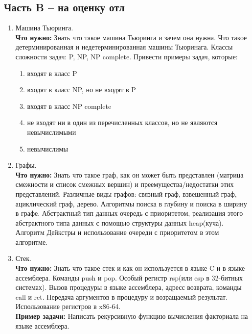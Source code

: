 \documentclass{article}
\begin{document}
\subsection*{Часть B -- на оценку отл}
\begin{enumerate}

\item Машина Тьюринга. \\
\textbf{Что нужно:} Знать что такое машина Тьюринга и зачем она нужна. Что такое детерминированная и недетерминированная машины Тьюринага. Классы сложности задач: P, NP, NP complete. Привести примеры задач, которые:
\begin{enumerate}
\item входят в класс P
\item входят в класс NP, но не входят в P
\item входят в класс NP complete
\item не входят ни в один из перечисленных классов, но не являются невычислимыми
\item невычислимы
\end{enumerate} 


\item Графы. \\
\textbf{Что нужно:} Знать что такое граф, как он может быть представлен (матрица смежности и список смежных вершин) и преемущества/недостатки этих представлений. Различные виды графов: связный граф, взвешенный граф, ациклический граф, дерево. Алгоритмы поиска в глубину и поиска в ширину в графе. Абстрактный тип данных очередь с приоритетом, реализация этого абстрактного типа данных с помощью структуры данных heap(куча). Алгоритм Дейкстры и использование очереди с приоритетом в этом алгоритме. \\


\item Стек. \\
\textbf{Что нужно:} Знать что такое стек и как он используется в языке C и в языке ассемблера. Команды push и pop. Особый регистр rsp(или esp в 32-битных системах). Вызов процедуры в языке ассемблера, адресс возврата, команды call и ret. Передача аргументов в процедуру и возращаемый результат. Использование регистров в x86-64.  \\
\textbf{Пример задачи:} Написать рекурсивную функцию вычисления факториала на языке ассемблера.\\



\end{enumerate}
\end{document}
